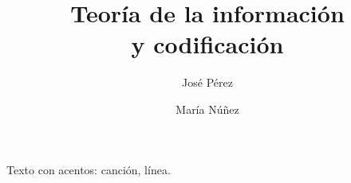 \documentclass{report}
\title{Teor\'ia de la informaci\'on\\ y codificaci\'on}
\author{José Pérez \and María Núñez}
\begin{document}
\maketitle
Texto con acentos: canción, línea.
\end{document}
